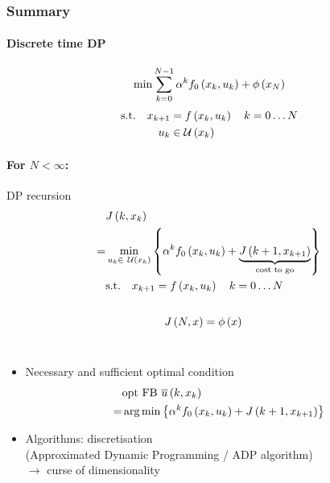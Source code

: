 \subsubsection{Summary}
\paragraph{Discrete time DP}
\begin{align}
\min \sum_{k=0}^{N-1} \alpha^k f_0 \left( x_k, u_k \right) + \phi \left( x_N \right)
\end{align}
\begin{align*}
\st{} \quad
    \x{k+1}    &= f \paren{x_k, u_k}    \quad k = 0 \dots N\\
    u_k        &\in \setU{x_k}
\end{align*}

\paragraph{For $N < \infty$:} DP recursion
\begin{gather*}
    \begin{align}
        & J \paren{k,x_k} \nonumber\\
        = & \min_{u_k \in ~ \setU{x_k}}
            \set{    \alpha^k f_0 \paren{x_k, u_k}
                 + \underbrace{ J \paren{k+1, \x{k+1}} }_{\txt{cost to go}} }\\
        & \st{} \quad \x{k+1}    = f \paren{x_k, u_k}    \quad k = 0 \dots N \nonumber
    \end{align}\\~\\
    \begin{align}
        J \paren{N, x} &= \phi \paren{x}
    \end{align}
\end{gather*}~
        
\begin{itemize}    
    \item Necessary and sufficient optimal condition
        \begin{align}
          &\txt{opt FB } \ubar{k, x_k} \nonumber \\
        = &\argmin
            \set{    \alpha^k f_0 \paren{x_k, u_k}
                     + J \paren{k+1, \x{k+1}} }
        \end{align}
    \item Algorithms: discretisation\\
            (Approximated Dynamic Programming / ADP
            algorithm)\\
            $\rightarrow$ curse of dimensionality
\end{itemize}~ 
    
